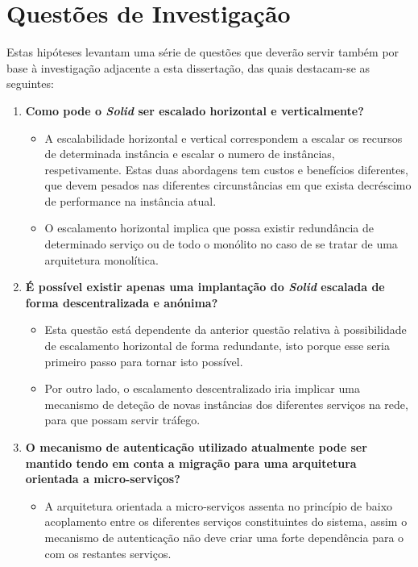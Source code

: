 \section{Questões de Investigação \label{section_investigation_questions}}
Estas hipóteses levantam uma série de questões que deverão servir também por base à investigação adjacente a esta dissertação, das quais destacam-se as seguintes:
\begin{enumerate}
    \item \textbf{Como pode o \emph{Solid} ser escalado horizontal e verticalmente?}
    \begin{itemize}
        \item A escalabilidade horizontal e vertical correspondem a escalar os recursos de determinada instância e escalar o numero de instâncias, respetivamente. Estas duas abordagens tem custos e benefícios diferentes, que devem pesados nas diferentes circunstâncias em que exista decréscimo de performance na instância atual.
        \item O escalamento horizontal implica que possa existir redundância de determinado serviço ou de todo o monólito no caso de se tratar de uma arquitetura monolítica.
    \end{itemize}
    \item \textbf{É possível existir apenas uma implantação do \emph{Solid} escalada de forma descentralizada e anónima?}
    \begin{itemize}
        \item Esta questão está dependente da anterior questão relativa à possibilidade de escalamento horizontal de forma redundante, isto porque esse seria primeiro passo para tornar isto possível.
        \item Por outro lado, o escalamento descentralizado iria implicar uma mecanismo de deteção de novas instâncias dos diferentes serviços na rede, para que possam servir tráfego.
    \end{itemize}
    \item \textbf{O mecanismo de autenticação utilizado atualmente pode ser mantido tendo em conta a migração para uma arquitetura orientada a micro-serviços?}
    \begin{itemize}
        \item A arquitetura orientada a micro-serviços assenta no princípio de baixo acoplamento entre os diferentes serviços constituintes do sistema, assim o mecanismo de autenticação não deve criar uma forte dependência para o com os restantes serviços\cite{building_microservices:2015}.
    \end{itemize}
\end{enumerate}

